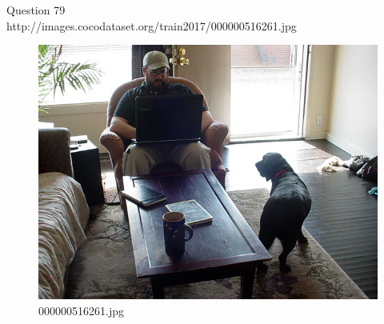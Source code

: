 Question 79\\
http://images.cocodataset.org/train2017/000000516261.jpg
\begin{figure}[h]
    \centering
    \includegraphics[width=0.8\linewidth]{../image set/hard/000000516261.jpg}
    \caption{000000516261.jpg}
\end{figure}
